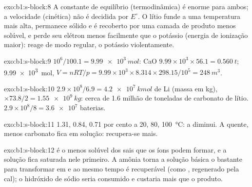 \begin{solution}{exo:b1:s-block:8}
A constante de equilíbrio (termodinâmica) é enorme para ambos; a
velocidade (cinética) não é decidida por $E^\circ$. O lítio funde a uma
temperatura mais alta, permanece sólido e é recoberto por uma camada de
produto menos solúvel, e perde seu elétron menos facilmente que o
potássio (energia de ionização maior): reage de modo regular, o potássio
violentamente.
\end{solution}

\begin{solution}{exo:b1:s-block:9}
$10^6/100.1 = \qty{9.99e3}{mol}$: CaO $9.99 \times 10^3 \times 56.1 =
\qty{0.560}{t}$;  \qty{9.99e3}{mol}, $V = nRT/p = 9.99 \times 10^3
\times 8.314 \times 298.15/10^5 = \qty{248}{m^3}$.
\end{solution}

\begin{solution}{exo:b1:s-block:10}
$2.9 \times 10^8/6.9 = \qty{4.2e7}{kmol}$ de Li (massa em kg), $\times 73.8/2 =
\qty{1.55e9}{kg}$: cerca de 1.6 milhão de toneladas de carbonato de lítio.
$2.9 \times 10^8/8 = \num{3.6e7}$ baterias.
\end{solution}

\begin{solution}{exo:b1:s-block:11}
1.31, 0.84, 0.71 por cento a 20, 80, \qty{100}{\celsius}: a 
diminui. A quente, menos carbonato fica em solução: recupera-se mais.
\end{solution}

\begin{solution}{exo:b1:s-block:12}
 é o menos solúvel dos sais que os íons podem formar, e a
solução fica saturada nele primeiro. A amônia torna a solução básica o
bastante para transformar  em  e ao mesmo tempo é
recuperável (como , regenerado pela cal); o hidróxido de sódio
seria consumido e custaria mais que o produto.
\end{solution}

